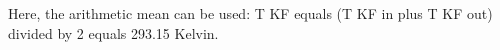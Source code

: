 Here, the arithmetic mean can be used:  
T KF equals (T KF in plus T KF out) divided by 2 equals 293.15 Kelvin.